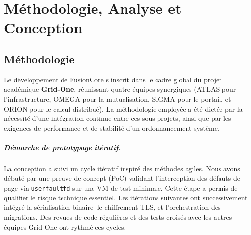 
\chapter{Méthodologie, Analyse et Conception}
\label{cp:analyse-conception}

\section{Méthodologie}
\label{sec:methodologie}

Le développement de FusionCore s'inscrit dans le cadre global du projet académique \textbf{Grid-One}, réunissant quatre équipes synergiques (ATLAS pour l'infrastructure, OMEGA pour la mutualisation, SIGMA pour le portail, et ORION pour le calcul distribué). La méthodologie employée a été dictée par la nécessité d'une intégration continue entre ces sous-projets, ainsi que par les exigences de performance et de stabilité d'un ordonnancement système.

\paragraph{Démarche de prototypage itératif.}
La conception a suivi un cycle itératif inspiré des méthodes agiles. Nous avons débuté par une preuve de concept (PoC) validant l'interception des défauts de page via \texttt{userfaultfd} sur une VM de test minimale. Cette étape a permis de qualifier le risque technique essentiel. Les itérations suivantes ont successivement intégré la sérialisation binaire, le chiffrement TLS, et l'orchestration des migrations. Des revues de code régulières et des tests croisés avec les autres équipes Grid-One ont rythmé ces cycles.

